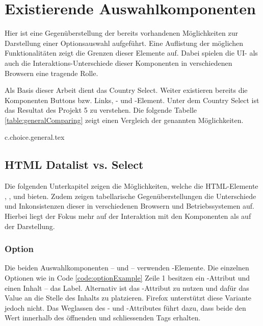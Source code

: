 \chapter{Existierende Auswahlkomponenten}
\label{chap:existingComponents}

Hier ist eine Gegenüberstellung der bereits vorhandenen Möglichkeiten zur Darstellung einer Optionsauswahl aufgeführt. 
Eine Auflistung der möglichen Funktionalitäten zeigt die Grenzen dieser Elemente auf. 
Dabei spielen die UI- als auch die Interaktions-Unterschiede dieser Komponenten in verschiedenen Browsern eine tragende Rolle. 

Als Basis dieser Arbeit dient das Country Select. 
Weiter existieren bereits die Komponenten Buttons bzw. Links, - und -Element. 
Unter dem Country Select ist das Resultat des Projekt 5 zu verstehen. 
Die folgende Tabelle \ref{table:generalComparing} zeigt einen Vergleich der genannten Möglichkeiten. 

{c.choice.general.tex}


\section{HTML Datalist vs. Select}
\label{sec:datalistSelect}

Die folgenden Unterkapitel zeigen die Möglichkeiten, welche die HTML-Elemente , ,  und  bieten. 
Zudem zeigen tabellarische Gegenüberstellungen die Unterschiede und Inkonsistenzen dieser in verschiedenen Browsern und Betriebssystemen auf. 
Hierbei liegt der Fokus mehr auf der Interaktion mit den Komponenten als auf der Darstellung. 


\subsection{Option}
\label{sec:option}

Die beiden Auswahlkomponenten –  und  – verwenden -Elemente. 
Die einzelnen Optionen wie in Code \ref{code:optionExample} Zeile 1 besitzen ein -Attribut und einen Inhalt – das Label. 
Alternativ ist das -Attribut zu nutzen und dafür das Value an die Stelle des Inhalts zu platzieren. 
Firefox unterstützt diese Variante jedoch nicht. 
Das Weglassen des - und -Attributes führt dazu, dass beide den Wert innerhalb des öffnenden und schliessenden Tags erhalten. 

